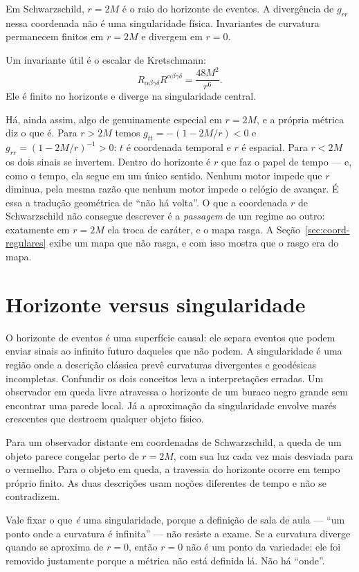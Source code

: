 \documentclass[12pt,a4paper,oneside]{book}
\theoremstyle{rgplain}
\theoremstyle{rgremark}
\begin{document}
Em Schwarzschild, $r=2M$ é o raio do horizonte de eventos. A divergência de
$g_{rr}$ nessa coordenada não é uma singularidade física. Invariantes de
curvatura permanecem finitos em $r=2M$ e divergem em $r=0$.

Um invariante útil é o escalar de Kretschmann:
\[
  R_{\alpha\beta\gamma\delta}R^{\alpha\beta\gamma\delta}
  =\frac{48M^2}{r^6}.
\]
Ele é finito no horizonte e diverge na singularidade central.

Há, ainda assim, algo de genuinamente especial em $r=2M$, e a própria métrica
diz o que é. Para $r>2M$ temos $g_{tt}=-(1-2M/r)<0$ e $g_{rr}=(1-2M/r)^{-1}>0$:
$t$ é coordenada temporal e $r$ é espacial. Para $r<2M$ os dois sinais se
invertem. Dentro do horizonte é $r$ que faz o papel de tempo --- e, como o
tempo, ela segue em um único sentido. Nenhum motor impede que $r$ diminua, pela
mesma razão que nenhum motor impede o relógio de avançar. É essa a tradução
geométrica de ``não há volta''. O que a coordenada $r$ de Schwarzschild não
consegue descrever é a \emph{passagem} de um regime ao outro: exatamente em
$r=2M$ ela troca de caráter, e o mapa rasga. A Seção~\ref{sec:coord-regulares}
exibe um mapa que não rasga, e com isso mostra que o rasgo era do mapa.

\section{Horizonte versus singularidade}

O horizonte de eventos é uma superfície causal: ele separa eventos que podem
enviar sinais ao infinito futuro daqueles que não podem. A singularidade é uma
região onde a descrição clássica prevê curvaturas divergentes e geodésicas
incompletas. Confundir os dois conceitos leva a interpretações erradas. Um
observador em queda livre atravessa o horizonte de um buraco negro grande sem
encontrar uma parede local. Já a aproximação da singularidade envolve marés
crescentes que destroem qualquer objeto físico.

Para um observador distante em coordenadas de Schwarzschild, a queda de um
objeto parece congelar perto de $r=2M$, com sua luz cada vez mais desviada para
o vermelho. Para o objeto em queda, a travessia do horizonte ocorre em tempo
próprio finito. As duas descrições usam noções diferentes de tempo e não se
contradizem.

Vale fixar o que \emph{é} uma singularidade, porque a definição de sala de aula
--- ``um ponto onde a curvatura é infinita'' --- não resiste a exame. Se a
curvatura diverge quando se aproxima de $r=0$, então $r=0$ não é um ponto da
variedade: ele foi removido justamente porque a métrica não está definida lá.
Não há ``onde''.
\end{document}

